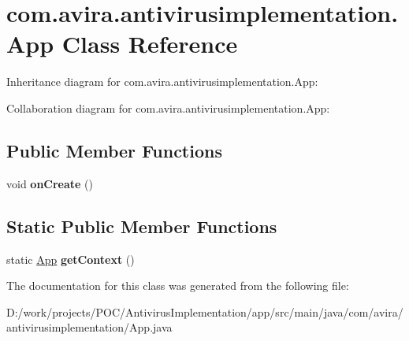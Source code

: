 \hypertarget{classcom_1_1avira_1_1antivirusimplementation_1_1_app}{}\section{com.\+avira.\+antivirusimplementation.\+App Class Reference}
\label{classcom_1_1avira_1_1antivirusimplementation_1_1_app}


Inheritance diagram for com.\+avira.\+antivirusimplementation.\+App\+:


Collaboration diagram for com.\+avira.\+antivirusimplementation.\+App\+:
\subsection*{Public Member Functions}
\begin{DoxyCompactItemize}
\item 
\hypertarget{classcom_1_1avira_1_1antivirusimplementation_1_1_app_a4a307973a4d5c3105732288e9cf01522}{}void {\bfseries on\+Create} ()\label{classcom_1_1avira_1_1antivirusimplementation_1_1_app_a4a307973a4d5c3105732288e9cf01522}

\end{DoxyCompactItemize}
\subsection*{Static Public Member Functions}
\begin{DoxyCompactItemize}
\item 
\hypertarget{classcom_1_1avira_1_1antivirusimplementation_1_1_app_a54431543ca22fac44c12aa87888b3119}{}static \hyperlink{classcom_1_1avira_1_1antivirusimplementation_1_1_app}{App} {\bfseries get\+Context} ()\label{classcom_1_1avira_1_1antivirusimplementation_1_1_app_a54431543ca22fac44c12aa87888b3119}

\end{DoxyCompactItemize}


The documentation for this class was generated from the following file\+:\begin{DoxyCompactItemize}
\item 
D\+:/work/projects/\+P\+O\+C/\+Antivirus\+Implementation/app/src/main/java/com/avira/antivirusimplementation/App.\+java\end{DoxyCompactItemize}
